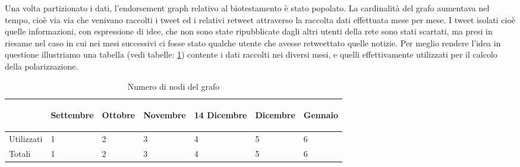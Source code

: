 Una volta partizionato i dati, l'endorsement graph relativo al biotestamento è stato popolato. La cardinalità del grafo aumentava nel tempo, cioè via via che venivano raccolti i tweet ed i relativi retweet attraverso la raccolta dati effettuata mese per mese. I tweet isolati cioè quelle informazioni, con espressione di idee, che non sono state ripubblicate dagli altri utenti della rete sono stati scartati, ma presi in riesame nel caso in cui nei mesi successivi ci fosse stato qualche utente che avesse retweettato quelle notizie.
Per meglio rendere l'idea in questione illustriamo una tabella (vedi tabelle: \ref{NoditotaliBio}) contente i dati raccolti nei diversi mesi, e quelli effettivamente utilizzati per il calcolo della polarizzazione.
\begin{table}

\begin{tabular}{ |p{1.7cm}|p{2cm}|p{1.7cm}|p{2.5cm}|p{2cm}|p{2cm}|p{2cm}| }
 \hline
 
 \begin{center}
 \textbf{}
 \end{center} & \begin{center}
 \textbf{Settembre}
 \end{center}& \begin{center}
 \textbf{Ottobre}
 \end{center} &\begin{center}
 \textbf{Novembre}
 \end{center} &\begin{center}
 \textbf{14 Dicembre}
 \end{center} &\begin{center}
 \textbf{Dicembre}
 \end{center}&\begin{center}
 \textbf{Gennaio}
 \end{center}\\
 \hline
 Utilizzati &1 & 2& 3 &4 & 5& 6 \\ \hline
 Totali  &1 & 2& 3 &4 & 5& 6   \\ 
 \hline
\end{tabular}
\caption{Numero di nodi del grafo}
 \label{NoditotaliBio}
\end{table}
